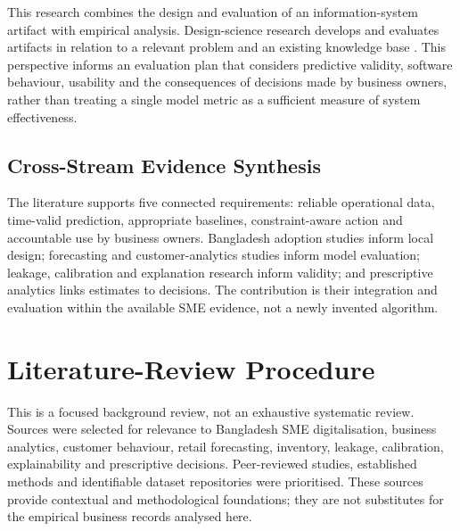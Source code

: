 \documentclass[a4paper,11pt,oneside]{book}
\theoremstyle{plain}
\theoremstyle{definition}
\theoremstyle{remark}
\begin{document}
This research combines the design and evaluation of an information-system artifact with empirical analysis. Design-science research develops and evaluates artifacts in relation to a relevant problem and an existing knowledge base \cite{hevner2004design}. This perspective informs an evaluation plan that considers predictive validity, software behaviour, usability and the consequences of decisions made by business owners, rather than treating a single model metric as a sufficient measure of system effectiveness.





\subsection{Cross-Stream Evidence Synthesis}
The literature supports five connected requirements: reliable operational
data, time-valid prediction, appropriate baselines, constraint-aware action
and accountable use by business owners. Bangladesh adoption studies inform local design;
forecasting and customer-analytics studies inform model evaluation; leakage,
calibration and explanation research inform validity; and prescriptive
analytics links estimates to decisions. The contribution is their integration
and evaluation within the available SME evidence, not a newly invented
algorithm.

\section{Literature-Review Procedure}
\label{sec:literature_review}
This is a focused background review, not an exhaustive systematic review.
Sources were selected for relevance to Bangladesh SME digitalisation,
business analytics, customer behaviour, retail forecasting, inventory,
leakage, calibration, explainability and prescriptive decisions. Peer-reviewed
studies, established methods and identifiable dataset repositories were
prioritised. These sources provide contextual and methodological foundations;
they are not substitutes for the empirical business records analysed here.
\end{document}
